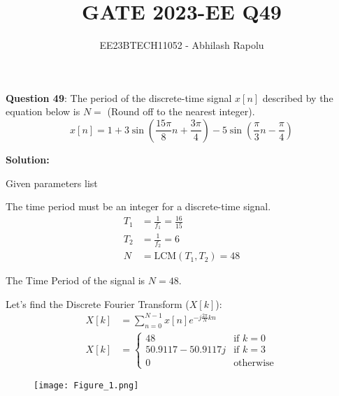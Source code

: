 \documentclass[journal,12pt,twocolumn]{IEEEtran}
\title{GATE 2023-EE Q49}
\author{EE23BTECH11052 - Abhilash Rapolu}
\begin{document}
\maketitle
\newpage
\textbf{Question 49}: The period of the discrete-time signal \(x[n]\) described by the equation below is \(N = \) (Round off to the nearest integer).
\[x[n] = 1 + 3\sin\left(\frac{15\pi}{8}n + \frac{3\pi}{4}\right) - 5\sin\left(\frac{\pi}{3}n - \frac{\pi}{4}\right)\]

\textbf{Solution:}
\begin{table}[htbp]
\centering
\caption{Given parameters list}
\end{table}

The time period must be an integer for a discrete-time signal.
\begin{align}
T_1 &= \frac{1}{f_1} = \frac{16}{15} \\
T_2 &= \frac{1}{f_2} = 6 \\
N &= \text{LCM}(T_1, T_2) = 48
\end{align}

The Time Period of the signal is \(N = 48\).

Let's find the Discrete Fourier Transform (\(X[k]\)):
\begin{align}
X[k] &= \sum_{n=0}^{N-1} x[n]e^{-j\frac{2\pi}{N}kn} \\
X[k] &= \begin{cases}
    48 & \text{if } k = 0 \\
    50.9117 - 50.9117j & \text{if } k = 3 \\
    0 & \text{otherwise}
\end{cases}
\end{align}

\begin{figure}[!ht] 
\centering
\texttt{[image: Figure\_1.png]}
\label{fig:Graph1}
\end{figure}
\end{document}
